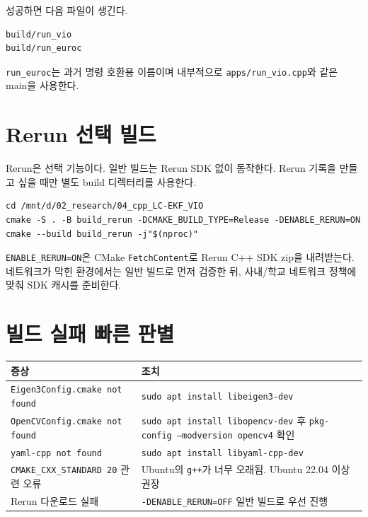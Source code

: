 \documentclass[11pt,a4paper,oneside]{report}
\begin{document}
성공하면 다음 파일이 생긴다.

\begin{lstlisting}[style=shell]
build/run_vio
build/run_euroc
\end{lstlisting}

\texttt{run\_euroc}는 과거 명령 호환용 이름이며 내부적으로 \texttt{apps/run\_vio.cpp}와
같은 main을 사용한다.

\section{Rerun 선택 빌드}

Rerun은 선택 기능이다. 일반 빌드는 Rerun SDK 없이 동작한다. Rerun 기록을 만들고 싶을 때만
별도 build 디렉터리를 사용한다.

\begin{lstlisting}[style=shell,caption={Rerun 활성 빌드}]
cd /mnt/d/02_research/04_cpp_LC-EKF_VIO
cmake -S . -B build_rerun -DCMAKE_BUILD_TYPE=Release -DENABLE_RERUN=ON
cmake --build build_rerun -j"$(nproc)"
\end{lstlisting}

\begin{warnbox}
\texttt{ENABLE\_RERUN=ON}은 CMake \texttt{FetchContent}로 Rerun C++ SDK zip을 내려받는다.
네트워크가 막힌 환경에서는 일반 빌드로 먼저 검증한 뒤, 사내/학교 네트워크 정책에 맞춰
SDK 캐시를 준비한다.
\end{warnbox}

\section{빌드 실패 빠른 판별}

\begin{longtable}{p{}p{}}
\toprule
증상 & 조치 \\
\midrule
\texttt{Eigen3Config.cmake not found} & \texttt{sudo apt install libeigen3-dev} \\
\texttt{OpenCVConfig.cmake not found} & \texttt{sudo apt install libopencv-dev} 후 \texttt{pkg-config --modversion opencv4} 확인 \\
\texttt{yaml-cpp not found} & \texttt{sudo apt install libyaml-cpp-dev} \\
\texttt{CMAKE\_CXX\_STANDARD 20} 관련 오류 & Ubuntu의 \texttt{g++}가 너무 오래됨. Ubuntu 22.04 이상 권장 \\
Rerun 다운로드 실패 & \texttt{-DENABLE\_RERUN=OFF} 일반 빌드로 우선 진행 \\
\bottomrule
\end{longtable}
\end{document}
